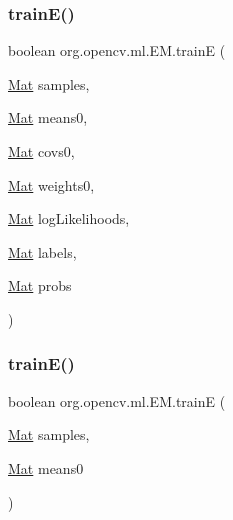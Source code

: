 \subsubsection{\texorpdfstring{train\+E()}{trainE()}\hspace{0.1cm}{\footnotesize\ttfamily [1/2]}}
{\footnotesize\ttfamily boolean org.\+opencv.\+ml.\+E\+M.\+trainE (\begin{DoxyParamCaption}\item[{\mbox{\hyperlink{classorg_1_1opencv_1_1core_1_1_mat}{Mat}}}]{samples,  }\item[{\mbox{\hyperlink{classorg_1_1opencv_1_1core_1_1_mat}{Mat}}}]{means0,  }\item[{\mbox{\hyperlink{classorg_1_1opencv_1_1core_1_1_mat}{Mat}}}]{covs0,  }\item[{\mbox{\hyperlink{classorg_1_1opencv_1_1core_1_1_mat}{Mat}}}]{weights0,  }\item[{\mbox{\hyperlink{classorg_1_1opencv_1_1core_1_1_mat}{Mat}}}]{log\+Likelihoods,  }\item[{\mbox{\hyperlink{classorg_1_1opencv_1_1core_1_1_mat}{Mat}}}]{labels,  }\item[{\mbox{\hyperlink{classorg_1_1opencv_1_1core_1_1_mat}{Mat}}}]{probs }\end{DoxyParamCaption})}

\mbox{\label{classorg_1_1opencv_1_1ml_1_1_e_m_afdfad3d3fa2f0074352f6e32058fac7e}} 
\subsubsection{\texorpdfstring{train\+E()}{trainE()}\hspace{0.1cm}{\footnotesize\ttfamily [2/2]}}
{\footnotesize\ttfamily boolean org.\+opencv.\+ml.\+E\+M.\+trainE (\begin{DoxyParamCaption}\item[{\mbox{\hyperlink{classorg_1_1opencv_1_1core_1_1_mat}{Mat}}}]{samples,  }\item[{\mbox{\hyperlink{classorg_1_1opencv_1_1core_1_1_mat}{Mat}}}]{means0 }\end{DoxyParamCaption})}

\mbox{\label{classorg_1_1opencv_1_1ml_1_1_e_m_a242fe35e37b4b1888ccab72ff8d959d0}} 
